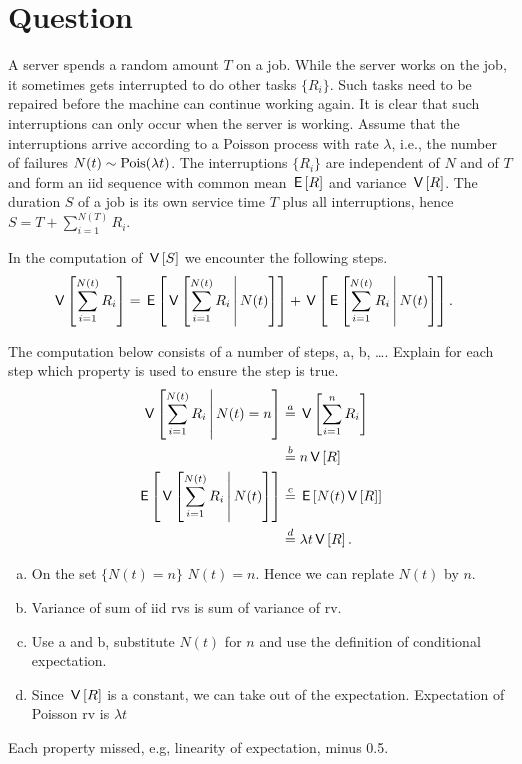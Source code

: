 \section*{Question}


A server  spends a random amount $T$ on a job.
While the server works on the job, it sometimes gets interrupted to do other tasks $\{R_{i}\}$.
Such tasks need to be repaired before the machine can continue working again.
It is clear that such interruptions can only occur when the server is working.
Assume that the interruptions arrive according to a Poisson process with rate $\lambda$, i.e., the number of failures $N(t) \sim\mathrm{Pois}(\lambda t)$.
The interruptions $\{R_{i}\}$ are independent of $N$ and of $T$ and form an iid sequence with common mean $\,\mathsf{E}\left[R\right]$ and variance $\,\mathsf{V}\left[R\right]$.
The  duration $S$ of a job  is its own service time $T$ plus all interruptions, hence $S = T+ \sum_{i=1}^{N(T)} R_{i}$.

\begin{exercise}[1.5]
In the computation of $\,\mathsf{V}\left[S\right]$ we encounter the following steps.
\begin{align}
\,\mathsf{V}\left[\sum_{i=1}^{N(t)} R_{i}\right] &= \,\mathsf{E}\left[\,\mathsf{V}\left[\sum_{i=1}^{N(t)} R_{i}\,\middle|\, N(t)\right]\right] + \,\mathsf{V}\left[\,\mathsf{E}\left[\sum_{i=1}^{N(t)} R_{i}\,\middle|\, N(t)\right]\right].
\end{align}

The computation below consists of a number of steps, a, b, \ldots. Explain for each step which property is used to ensure the step is true.
\begin{align}
\,\mathsf{V}\left[\sum_{i=1}^{N(t)} R_{i}\,\middle|\, N(t)=n\right] &\stackrel{a}{=} \,\mathsf{V}\left[\sum_{i=1}^{n} R_{i}\right]  \\
  &\stackrel{b}{=} n \,\mathsf{V}\left[R\right] \\
\,\mathsf{E}\left[\,\mathsf{V}\left[\sum_{i=1}^{N(t)} R_{i}\,\middle|\, N(t)\right]\right] &  \stackrel{c}{=} \,\mathsf{E}\left[N(t) \,\mathsf{V}\left[R\right]\right] \\
&  \stackrel{d}{=}  \lambda t \,\mathsf{V}\left[R\right].
\end{align}
\begin{solution}
  \begin{enumerate}[a.]
  \item  On the set $\{N(t)=n\}$ $N(t)=n$. Hence we can replate  $N(t)$ by $n$.
  \item  Variance of sum of iid rvs is sum of variance of rv.
  \item  Use a and b, substitute $N(t)$ for $n$ and use the definition of conditional expectation.
  \item  Since $\,\mathsf{V}\left[R\right]$ is a constant, we can take out of the expectation. Expectation of Poisson rv is $\lambda t$
  \end{enumerate}
Each  property missed, e.g, linearity of expectation, minus 0.5.
\end{solution}
\end{exercise}


